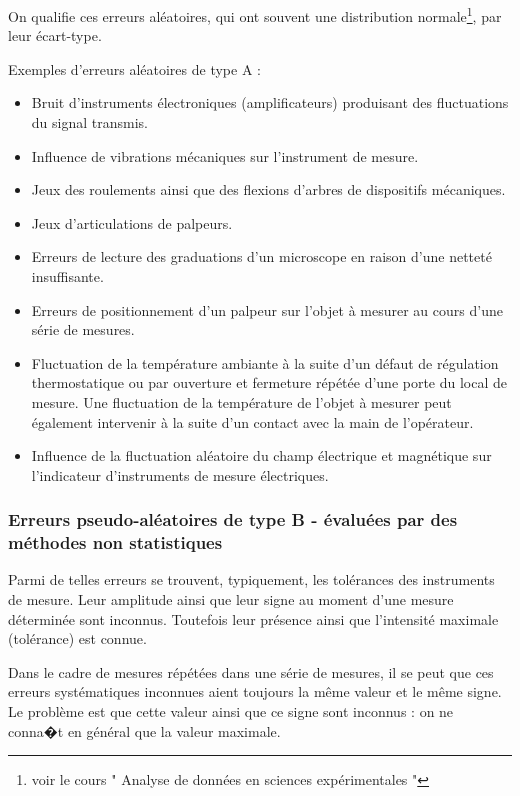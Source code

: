 On qualifie ces erreurs aléatoires, qui ont souvent une distribution normale\footnote{voir le cours " Analyse de données en sciences expérimentales "}, par leur écart-type.

Exemples d'erreurs aléatoires de type A :
\begin{itemize}\itemsep2pt
\renewcommand{\labelitemi}{$\bullet$}
\item Bruit d'instruments électroniques (amplificateurs) produisant des fluctuations du signal transmis.
\item Influence de vibrations mécaniques sur l'instrument de mesure.
\item Jeux des roulements ainsi que des flexions d'arbres de dispositifs mécaniques.
\item Jeux d'articulations de palpeurs.
\item Erreurs de lecture des graduations d'un microscope en raison d'une netteté insuffisante.
\item Erreurs de positionnement d'un palpeur sur l'objet à mesurer au cours d'une série de mesures.
\item Fluctuation de la température ambiante à la suite d'un défaut de régulation thermostatique ou par ouverture et fermeture répétée d'une porte du local de mesure. Une fluctuation de la température de l'objet à mesurer peut également intervenir à la suite d'un contact avec la main de l'opérateur.
\item Influence de la fluctuation aléatoire du champ électrique et magnétique sur l'indicateur d'instruments de mesure électriques.
\end{itemize}

\subsubsection{Erreurs pseudo-aléatoires de type B - évaluées par des méthodes non statistiques}

Parmi de telles erreurs se trouvent, typiquement, les tolérances des instruments de mesure. Leur amplitude ainsi que leur signe au moment d'une mesure déterminée sont inconnus. Toutefois leur présence ainsi que l'intensité maximale (tolérance) est connue.

Dans le cadre de mesures répétées dans une série de mesures, il se peut que ces erreurs systématiques inconnues aient toujours la même valeur et le même signe.  Le problème est que cette valeur ainsi que ce signe sont inconnus : on ne conna�t en général que la valeur maximale.

